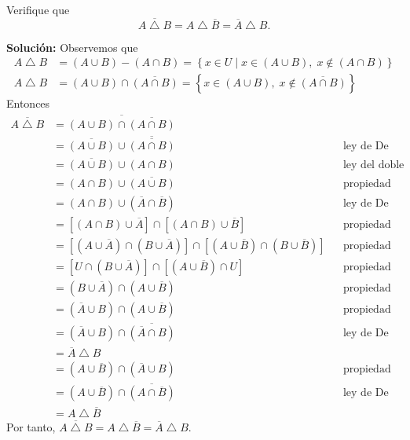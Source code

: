 \begin{myexample}
    Verifique que
    $$\overline{A \bigtriangleup B} = A \bigtriangleup \overline{B} = \overline{A} \bigtriangleup B.$$

    \tcblower
    \textbf{\color{jblueleft}Solución:} Observemos que
    \begin{align*}
        A \bigtriangleup B & = (A \cup B) - (A \cap B) = \left\{ x \in U \mid x \in (A \cup B), \; x \notin (A \cap B) \right\} \\
        A \bigtriangleup B & = (A \cup B) \cap \overline{(A \cap B)} = \left\{ x \in (A \cup B), \; x \notin \overline{(A \cap B)} \right\}
    \end{align*}
    Entonces
    \begin{align*}
        \overline{A \bigtriangleup B} & = \overline{(A \cup B) \cap \overline{(A \cap B)}} \\
        & = \overline{(A \cup B)} \cup \overline{\overline{(A \cap B)}} && \text{ley de De Morgan} \\
        & = \overline{(A \cup B)} \cup (A \cap B) && \text{ley del doble complemento} \\
        & = (A \cap B) \cup \overline{(A \cup B)} && \text{propiedad conmutativa} \\
        & = (A \cap B) \cup \left( \overline{A} \cap \overline{B} \right) && \text{ley de De Morgan} \\
        & = \left[ (A \cap B) \cup \overline{A} \right] \cap \left[ (A \cap B) \cup \overline{B} \right] && \text{propiedad distributiva} \\
        & = \left[ \left( A \cup \overline{A} \right) \cap \left( B \cup \overline{A} \right) \right] \cap \left[ \left( A \cup \overline{B} \right) \cap \left( B \cup \overline{B} \right) \right] && \text{propiedad distributiva} \\
        & = \left[ U \cap \left( B \cup \overline{A} \right) \right] \cap \left[ \left( A \cup \overline{B} \right) \cap U \right] && \text{propiedad del inverso} \\
        & = \left( B \cup \overline{A} \right) \cap \left( A \cup \overline{B} \right) && \text{propiedad del neutro} \\
        & = \left(\overline{A} \cup B \right) \cap \left( A \cup \overline{B} \right) && \text{propiedad conmutativa} \\
        & = \left( \overline{A} \cup B \right) \cap \overline{\left( \overline{A} \cap B \right)} && \text{ley de De Morgan} \\
        & = \overline{A} \bigtriangleup B \\
        & = \left( A \cup \overline{B} \right) \cap \left( \overline{A} \cup B \right) && \text{propiedad conmutativa} \\
        & = \left( A \cup \overline{B} \right) \cap \overline{\left( A \cap \overline{B} \right)} && \text{ley de De Morgan} \\
        & = A \bigtriangleup \overline{B}
    \end{align*}
    Por tanto, $\overline{A \bigtriangleup B} = A \bigtriangleup \overline{B} = \overline{A} \bigtriangleup B$.
\end{myexample}

